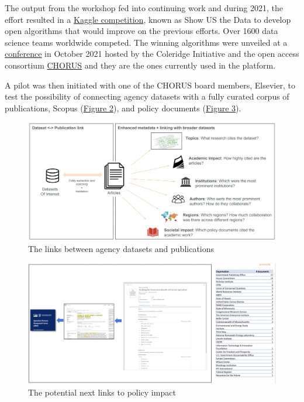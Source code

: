 \documentclass[titlepage, 11pt]{article}
\begin{document}
{The output from the workshop fed into continuing work and during 2021,  the effort resulted in a \href{https://www.kaggle.com/c/coleridgeinitiative-show-us-the-data}{Kaggle competition}, known as Show US the Data to develop open algorithms that would improve on the previous efforts. Over 1600 data science teams worldwide competed. The winning algorithms were unveiled at a \href{https://www.youtube.com/watch?v=H3uOkBzsAFg}{conference} in October 2021 hosted by the Coleridge Initiative and the open access consortium \href{https://www.chorusaccess.org/}{CHORUS} and they are the ones currently used in the platform.


A pilot was then initiated with one of the CHORUS board members, Elsevier, to test the possibility of connecting agency datasets with a fully curated corpus of publications, Scopus (\hyperref[fig:links]{Figure 2}), and policy documents (\hyperref[fig:policy_impact]{Figure 3}).

\begin{figure}
  \includegraphics[scale=0.35]{links_dataset_publication.png}
  \caption{The links between agency datasets and publications}
  \label{fig:links}
\end{figure}

\begin{figure}
  \includegraphics[scale=0.42]{policy_impact.png}
  \caption{The potential next links to policy impact}
  \label{fig:policy_impact}
\end{figure}

}
\end{document}
